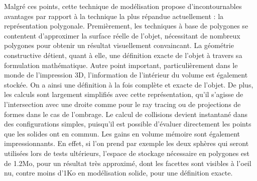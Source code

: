 \documentclass{tnreport}
\begin{document}
Malgré ces points, cette technique de modélisation propose d'incontournables avantages par rapport à la technique la plus répandue actuellement : la représentation polygonale. Premièrement, les techniques à base de polygones se contentent d'approximer la surface réelle de l'objet, nécessitant de nombreux polygones pour obtenir un résultat visuellement convaincant. La géométrie constructive détient, quant à elle, une définition exacte de l'objet à travers sa formulation mathématique. Autre point important, particulièrement dans le monde de l'impression 3D, l'information de l'intérieur du volume est également stockée. On a ainsi une définition à la fois complète et exacte de l'objet. De plus, les calculs sont largement simplifiés avec cette représentation, qu'il s'agisse de l'intersection avec une droite comme pour le ray tracing ou de projections de formes dans le cas de l'ombrage. Le calcul de collisions devient instantané dans des configurations simples, puisqu'il est possible d'évaluer directement les points que les solides ont en commun. Les gains en volume mémoire sont également impressionnants. En effet, si l'on prend par exemple les deux sphères qui seront utilisées lors de tests ultérieurs, l'espace de stockage nécessaire en polygones est de 1.2Mo, pour un résultat très approximé, dont les facettes sont visibles à l'oeil nu, contre moins d'1Ko en modélisation solide, pour une définition exacte. 
\end{document}
